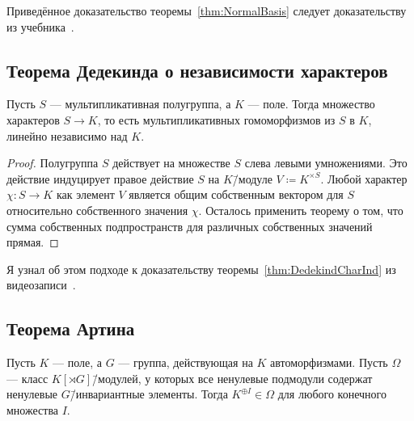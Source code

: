 \documentclass[
	extrafontsizes,
	11pt,
	hyphens,
]{memoir}
\begin{document}
\begin{remark}
Приведённое доказательство теоремы~\ref{thm:NormalBasis} следует доказательству из учебника~\cite[70]{milneFT_v5.10}.
\end{remark}

\subsection{Теорема Дедекинда о независимости характеров}

\begin{theorem}
Пусть \(S\) --- мультипликативная полугруппа, а \(K\) --- поле.%
\label{thm:DedekindCharInd}
Тогда множество характеров \(S \to K\), то есть мультипликативных гомоморфизмов из \(S\) в \(K\), линейно независимо над \(K\).
\end{theorem}

\begin{proof}
Полугруппа \(S\) действует на множестве \(S\) слева левыми умножениями. Это действие индуцирует правое действие \(S\) на \(K\)\=/модуле \(V \coloneqq K^{\times S}\).
Любой характер \(\chi : S \to K\) как элемент \(V\) является общим собственным вектором для \(S\) относительно собственного значения \(\chi\).
Осталось применить теорему о том, что сумма собственных подпространств для различных собственных значений прямая.
\end{proof}

\begin{remark}
Я узнал об этом подходе к доказательству теоремы~\ref{thm:DedekindCharInd} из видеозаписи~\cite[лекция 5, 1:06:40]{Gorchinskiy_Galois_2022}.
\end{remark}


\subsection{Теорема Артина}

\begin{lemma}
Пусть \(K\) --- поле, а \(G\) --- группа, действующая на \(K\) автоморфизмами.%
\label{lem:ArtinFieldAut}
Пусть \(\Omega\) --- класс \(K[\rtimes G]\)\=/модулей, у которых все ненулевые подмодули содержат ненулевые \(G\)\=/инвариантные элементы.
Тогда \(K^{\oplus I} \in \Omega\) для любого конечного множества \(I\).
\end{lemma}
\end{document}
